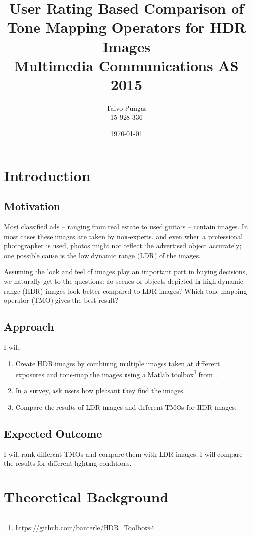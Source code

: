 \documentclass[a4paper]{scrartcl}
\title{User Rating Based Comparison of Tone Mapping Operators for HDR Images \\ Multimedia Communications AS 2015} %
\author{Taivo Pungas \\ 15-928-336} %
\date{\today} %
\begin{document}
\maketitle %


\section{Introduction}
\subsection{Motivation}

Most classified ads -- ranging from real estate to used guitars -- contain images. In most cases these images are taken by non-experts, and even when a professional photographer is used, photos might not reflect the advertised object accurately; one possible cause is the low dynamic range (LDR) of the images.

Assuming the look and feel of images play an important part in buying decisions, we naturally get to the questions: do scenes or objects depicted in high dynamic range (HDR) images look better compared to LDR images? Which tone mapping operator (TMO) gives the best result?


\subsection{Approach}

I will:
\begin{enumerate}
	\item Create HDR images by combining multiple images taken at different exposures and tone-map the images using a Matlab toolbox\footnote{\url{https://github.com/banterle/HDR_Toolbox}} from \cite{Banterle:2011}.
	\item In a survey, ask users how pleasant they find the images.
	\item Compare the results of LDR images and different TMOs for HDR images.
\end{enumerate}

\subsection{Expected Outcome}

I will rank different TMOs and compare them with LDR images. I will compare the results for different lighting conditions.

\section{Theoretical Background}
\end{document}
